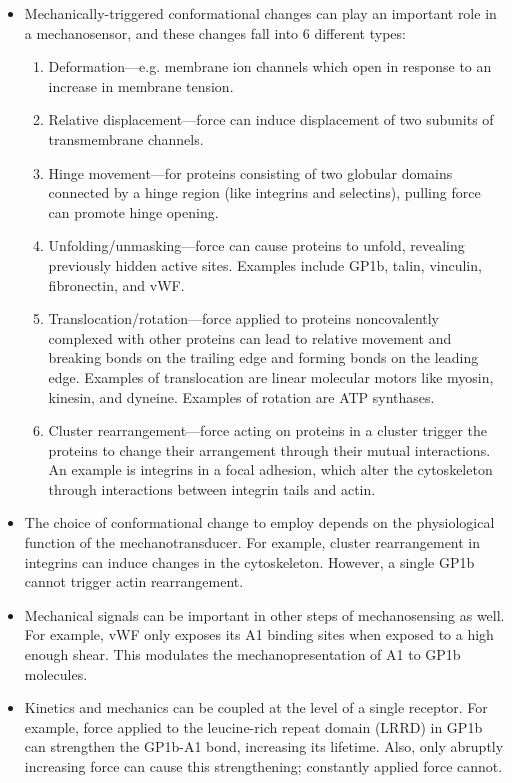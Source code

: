 \documentclass[
10pt, %
letterpaper, %
twocolumn, %
landscape %
]{article}
\begin{document}
\begin{itemize}
\item Mechanically-triggered conformational changes can play an
  important role in a mechanosensor, and these changes fall into 6
  different types:
  \begin{enumerate}
  \item Deformation---e.g. membrane ion channels which open in
    response to an increase in membrane tension.
  \item Relative displacement---force can induce displacement of two
    subunits of transmembrane channels.
  \item Hinge movement---for proteins consisting of two globular
    domains connected by a hinge region (like integrins and
    selectins), pulling force can promote hinge opening.
  \item Unfolding/unmasking---force can cause proteins to unfold,
    revealing previously hidden active sites. Examples include GP1b,
    talin, vinculin, fibronectin, and vWF.
  \item Translocation/rotation---force applied to proteins
    noncovalently complexed with other proteins can lead to relative
    movement and breaking bonds on the trailing edge and forming bonds
    on the leading edge. Examples of translocation are linear
    molecular motors like myosin, kinesin, and dyneine. Examples of
    rotation are ATP synthases.
  \item Cluster rearrangement---force acting on proteins in a cluster
    trigger the proteins to change their arrangement through their
    mutual interactions. An example is integrins in a focal adhesion,
    which alter the cytoskeleton through interactions between integrin
    tails and actin.
  \end{enumerate}
\item The choice of conformational change to employ depends on the
  physiological function of the mechanotransducer. For example,
  cluster rearrangement in integrins can induce changes in the
  cytoskeleton. However, a single GP1b cannot trigger actin
  rearrangement.
\item Mechanical signals can be important in other steps of
  mechanosensing as well. For example, vWF only exposes its A1 binding
  sites when exposed to a high enough shear. This modulates the
  mechanopresentation of A1 to GP1b molecules.
\item Kinetics and mechanics can be coupled at the level of a single
  receptor. For example, force applied to the leucine-rich repeat
  domain (LRRD) in GP1b can strengthen the GP1b-A1 bond, increasing
  its lifetime. Also, only abruptly increasing force can cause this
  strengthening; constantly applied force cannot.
\end{itemize}
\end{document}
